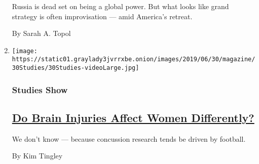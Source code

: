 \begin{enumerate}
  Russia is dead set on being a global power. But what looks like grand
  strategy is often improvisation --- amid America's retreat.

  By Sarah A. Topol
\item
  \texttt{[image: https://static01.graylady3jvrrxbe.onion/images/2019/06/30/magazine/30Studies/30Studies-videoLarge.jpg]}

  \hypertarget{studies-show}{%
  \subsubsection{Studies Show}\label{studies-show}}

  \hypertarget{do-brain-injuries-affect-women-differently}{%
  \subsection{\texorpdfstring{\href{/2019/06/26/magazine/do-brain-injuries-affect-women-differently-than-men.html}{Do
  Brain Injuries Affect Women
  Differently?}}{Do Brain Injuries Affect Women Differently?}}\label{do-brain-injuries-affect-women-differently}}

  We don't know --- because concussion research tends be driven by
  football.

  By Kim Tingley
\end{enumerate}

